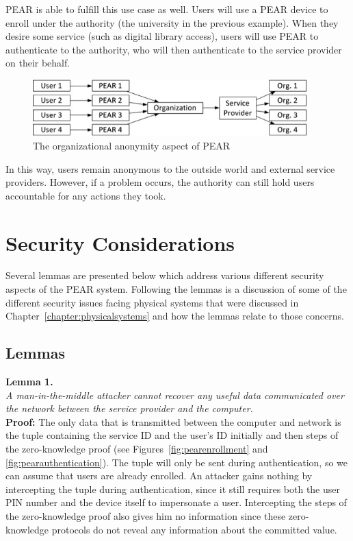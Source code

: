 PEAR is able to fulfill this use case as well. Users will use a PEAR device to enroll under the authority (the university
in the previous example). When they desire some service (such as digital library access), users will use PEAR to 
authenticate to the authority, who will then authenticate to the service provider on their behalf.

\begin{figure}[!ht]
\centering
\includegraphics[width=400px]{images/pearorgnaizational.jpg}
\caption{The organizational anonymity aspect of PEAR}
\label{fig:pearorganizational}
\vspace{-20pt}
\end{figure}
\FloatBarrier

In this way, users remain anonymous to the outside world and external service providers. However, if a problem occurs,
the authority can still hold users accountable for any actions they took.

\section{Security Considerations}
Several lemmas are presented below which address various different security aspects of the PEAR system.
Following the lemmas is a discussion of some of the different security issues facing physical systems that
were discussed in Chapter~\ref{chapter:physicalsystems} and how the lemmas relate to those concerns.

\subsection{Lemmas}
\noindent \textbf{Lemma 1.} \\
\noindent \emph{A man-in-the-middle attacker cannot recover any useful data communicated over the network between the
service provider and the computer.} \\
{\bf Proof:}  The only data that is transmitted between the computer and network is the tuple containing the service
ID and the user's ID initially and then steps of the zero-knowledge proof (see Figures~\ref{fig:pearenrollment} and
\ref{fig:pearauthentication}). The tuple will only be sent during authentication, so we can assume that users are already enrolled.
An attacker gains nothing by intercepting the tuple during authentication, since it still requires both the user PIN
number and the device itself to impersonate a user. Intercepting the steps of the zero-knowledge proof also gives him
no information since these zero-knowledge protocols do not reveal any information about the committed value.

